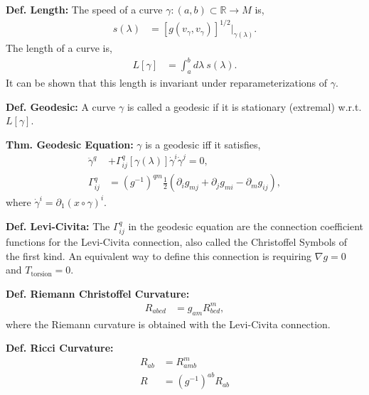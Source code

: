 \documentclass[12pt]{article}
\begin{document}
\begin{multicols}{2}
  \noindent
  \textbf{Def. Length:}
  The speed of a curve $\gamma: (a, b) \subset \mathbb{R} \rightarrow M$ is,
  \begin{align}
    s(\lambda) &= [g(v_{\gamma}, v_{\gamma})]^{1/2} \lvert_{\gamma(\lambda)}.
  \end{align}
  The length of a curve is,
  \begin{align}
    L[\gamma] &= \int_a^b d\lambda \ s(\lambda).
  \end{align}
  It can be shown that this length is invariant under reparameterizations of $\gamma$.

  \noindent
  \textbf{Def. Geodesic:} A curve $\gamma$ is called a geodesic if it is stationary (extremal)
  w.r.t. $L[\gamma]$.

  \noindent
  \textbf{Thm. Geodesic Equation:} $\gamma$ is a geodesic iff it satisfies,
  \begin{align}
    \ddot{\gamma}^q &+ \Gamma^q_{ij}[\gamma(\lambda)] \dot{\gamma}^i \dot{\gamma}^j = 0,\\
    \Gamma^q_{ij} &= (g^{-1})^{qm} \frac{1}{2}(\partial_i g_{mj} + \partial_j g_{mi} - \partial_m g_{ij}),
  \end{align}
  where $\dot{\gamma}^i = \partial_1 (x \circ \gamma)^i$.

  \noindent
  \textbf{Def. Levi-Civita:}
  The $\Gamma^q_{ij}$ in the geodesic equation are the connection coefficient functions for the Levi-Civita connection,
  also called the Christoffel Symbols of the first kind.
  An equivalent way to define this connection is requiring $\nabla g = 0$ and $T_{\textrm{torsion}} = 0$.

  \noindent
  \textbf{Def. Riemann Christoffel Curvature:}
  \begin{align}
    R_{abcd} &= g_{am} R^m_{bcd},
  \end{align}
  where the Riemann curvature is obtained with the Levi-Civita connection.

  \noindent
  \textbf{Def. Ricci Curvature:}
  \begin{align}
    R_{ab} &= R^m_{amb}\\
    R &= (g^{-1})^{ab} R_{ab}
  \end{align}

  
\end{multicols}
\end{document}
